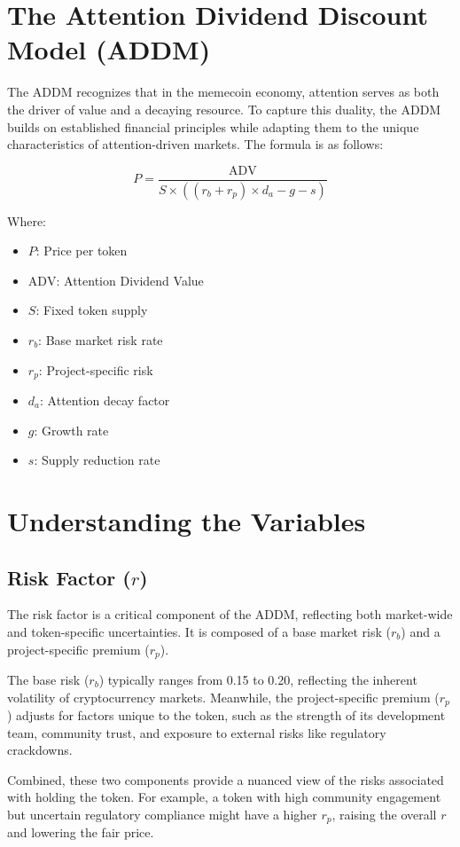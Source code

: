 \documentclass[a4paper,12pt]{article}
\begin{document}
\section*{The Attention Dividend Discount Model (ADDM)}

The ADDM recognizes that in the memecoin economy, attention serves as both the driver of value and a decaying resource. To capture this duality, the ADDM builds on established financial principles while adapting them to the unique characteristics of attention-driven markets. The formula is as follows:

\[
P = \frac{\text{ADV}}{S \times ((r_b + r_p) \times d_a - g - s)}
\]

Where:
\begin{itemize}
    \item $P$: Price per token
    \item $\text{ADV}$: Attention Dividend Value
    \item $S$: Fixed token supply
    \item $r_b$: Base market risk rate
    \item $r_p$: Project-specific risk
    \item $d_a$: Attention decay factor
    \item $g$: Growth rate
    \item $s$: Supply reduction rate
\end{itemize}

\section*{Understanding the Variables}

\subsection*{Risk Factor (\( r \))}

The risk factor is a critical component of the ADDM, reflecting both market-wide and token-specific uncertainties. It is composed of a base market risk (\( r_b \)) and a project-specific premium (\( r_p \)).

The base risk (\( r_b \)) typically ranges from 0.15 to 0.20, reflecting the inherent volatility of cryptocurrency markets. Meanwhile, the project-specific premium (\( r_p \)) adjusts for factors unique to the token, such as the strength of its development team, community trust, and exposure to external risks like regulatory crackdowns.

Combined, these two components provide a nuanced view of the risks associated with holding the token. For example, a token with high community engagement but uncertain regulatory compliance might have a higher \( r_p \), raising the overall \( r \) and lowering the fair price.
\end{document}
